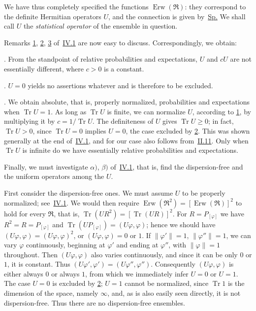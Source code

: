 \documentclass[fontsize=13pt,twoside,openany,headings=normal,parskip=false,bookmarkpackage=false,DIV=calc]{scrbook}
\begin{document}
We have thus completely specified the functions $\operatorname{Erw}(\mathfrak R)$: they correspond to the definite Hermitian operators $U$, and the connection is given by~\hyperref[eq:IV.2.Sp]{Sp.} We shall call $U$ the \emph{statistical operator} of the ensemble in question.

Remarks \hyperref[remark:IV.1.1]{1}, \hyperref[remark:IV.1.2]{2}, \hyperref[remark:IV.1.3]{3} of~\hyperref[sec:IV.1]{IV.1} are now easy to discuss. Correspondingly, we obtain:

\noindent{}.\label{remark:IV.2.1} From the standpoint of relative probabilities and expectations, $U$ and $cU$ are not essentially different, where $c>0$ is a constant.

\hypertarget{origpage-169}{}%
\noindent{}.\label{remark:IV.2.2} $U=0$ yields no assertions whatever and is therefore to be excluded.

\noindent{}.\label{remark:IV.2.3} We obtain absolute, that is, properly normalized, probabilities and expectations when $\operatorname{Tr}U=1$. As long as $\operatorname{Tr}U$ is finite, we can normalize $U$, according to \hyperref[remark:IV.2.1]{1}, by multiplying it by $c=1/\operatorname{Tr}U$. The definiteness of $U$ gives $\operatorname{Tr}U\geq0$; in fact, $\operatorname{Tr}U>0$, since $\operatorname{Tr}U=0$ implies $U=0$, the case excluded by \hyperref[remark:IV.2.2]{2}. This was shown generally at the end of~\hyperref[sec:IV.1]{IV.1}, and for our case also follows from~\hyperref[sec:II.11]{II.11}. Only when $\operatorname{Tr}U$ is infinite do we have essentially relative probabilities and expectations.

Finally, we must investigate \hyperref[def:IV.1.alpha]{$\alpha)$}, \hyperref[def:IV.1.beta]{$\beta)$} of~\hyperref[sec:IV.1]{IV.1}, that is, find the dispersion-free and the uniform operators among the $U$.

First consider the dispersion-free ones. We must assume $U$ to be properly normalized; see~\hyperref[sec:IV.1]{IV.1}. We would then require $\operatorname{Erw}(\mathfrak R^2)=[\operatorname{Erw}(\mathfrak R)]^2$ to hold for every $\mathfrak R$, that is, $\operatorname{Tr}(UR^2)=[\operatorname{Tr}(UR)]^2$. For $R=P_{[\varphi]}$ we have $R^2=R=P_{[\varphi]}$ and $\operatorname{Tr}(UP_{[\varphi]})=(U\varphi,\varphi)$; hence we should have $(U\varphi,\varphi)=(U\varphi,\varphi)^2$, or $(U\varphi,\varphi)=0$ or $1$. If $\|\varphi'\|=1$, $\|\varphi''\|=1$, we can vary $\varphi$ continuously, beginning at $\varphi'$ and ending at $\varphi''$, with $\|\varphi\|=1$ throughout. Then $(U\varphi,\varphi)$ also varies continuously, and since it can be only $0$ or $1$, it is constant. Thus $(U\varphi',\varphi')=(U\varphi'',\varphi'')$. Consequently $(U\varphi,\varphi)$ is either always $0$ or always $1$, from which we immediately infer $U=0$ or $U=1$. The case $U=0$ is excluded by \hyperref[remark:IV.2.2]{2}; $U=1$ cannot be normalized, since $\operatorname{Tr}1$ is the dimension of the space, namely $\infty$, and, as is also easily seen directly, it is not dispersion-free. Thus there are no dispersion-free ensembles.
\end{document}
